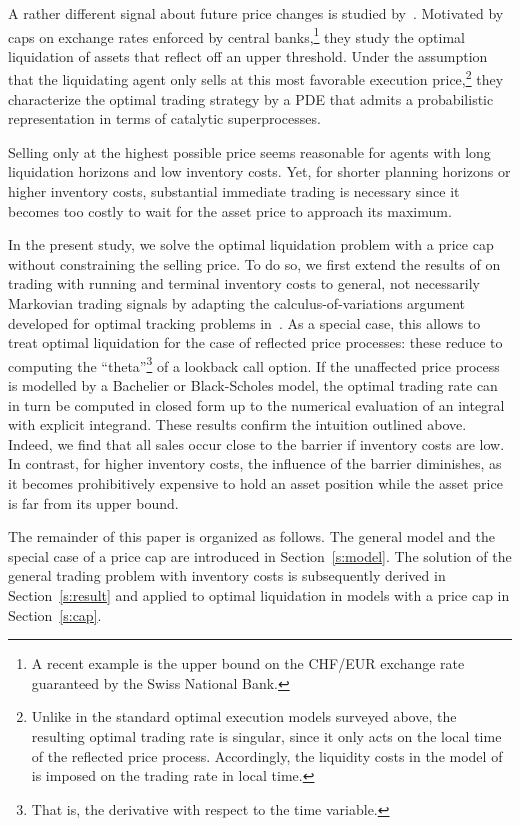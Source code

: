 \documentclass[11pt]{article}
\numberwithin{equation}{section}
\theoremstyle{definition}
\theoremstyle{remark}
\begin{document}
A rather different signal about future price changes is studied by~\cite{neuman.schied.16}. Motivated by caps on exchange rates enforced by central banks,\footnote{A recent example is the upper bound on the CHF/EUR exchange rate guaranteed by the Swiss National Bank.} they study the optimal liquidation of assets that reflect off an upper threshold.  Under the assumption that the liquidating agent only sells at this most favorable execution price,\footnote{Unlike in the standard optimal execution models surveyed above, the resulting optimal trading rate is singular, since it only acts on the local time of the reflected price process. Accordingly, the liquidity costs in the model of \cite{neuman.schied.16} is imposed on the trading rate in local time.} they characterize the optimal trading strategy by a PDE that admits a probabilistic representation in terms of catalytic superprocesses. 

Selling only at the highest possible price seems reasonable for agents with long liquidation horizons and low inventory costs. Yet, for shorter planning horizons or higher inventory costs, substantial immediate trading is necessary since it becomes too costly to wait for the asset price to approach its maximum.

In the present study, we solve the optimal liquidation problem with a price cap without constraining the selling price. To do so, we first extend the results of \cite{lehalle2017incorporating} on trading with running and terminal inventory costs to general, not necessarily Markovian trading signals by adapting the calculus-of-variations argument developed for optimal tracking problems in~\cite{bank2017hedging,bouchard2017equilibrium}. As a special case, this allows to treat optimal liquidation for the case of reflected price processes: these reduce to computing the ``theta''\footnote{That is, the derivative with respect to the time variable.} of a lookback call option. If the unaffected price process is modelled by a Bachelier or Black-Scholes model, the optimal trading rate can in turn be computed in closed form up to the numerical evaluation of an integral with explicit integrand. These results confirm the intuition outlined above. Indeed, we find that all sales occur close to the barrier if inventory costs are low. In contrast, for higher inventory costs, the influence of the barrier diminishes, as it becomes prohibitively expensive to hold an asset position while the asset price is far from its upper bound.

The remainder of this paper is organized as follows. The general model and the special case of a price cap are introduced in Section~\ref{s:model}. The solution of the general trading problem with inventory costs is subsequently derived in Section~\ref{s:result} and applied to optimal liquidation in models with a price cap in Section~\ref{s:cap}.
\end{document}

